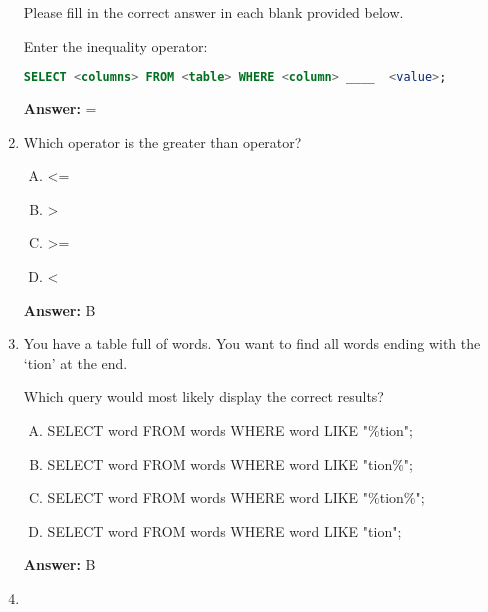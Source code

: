 \documentclass[12pt]{article}
\begin{document}
\begin{enumerate}[1.]
    Please fill in the correct answer in each blank provided below.

    \bigskip

    Enter the inequality operator:

    \bigskip

    \begin{lstlisting}[language=SQL]
    SELECT <columns> FROM <table> WHERE <column> ____  <value>;
    \end{lstlisting}

    \bigskip

    \textbf{Answer:} =

    \item

    Which operator is the greater than operator?

    \bigskip

    \begin{enumerate}[A.]
        \item <=
        \item >
        \item >=
        \item <
    \end{enumerate}

    \bigskip

    \textbf{Answer:} B

    \item

    You have a table full of words. You want to find all words ending with the
    `tion' at the end.

    \bigskip

    Which query would most likely display the correct results?

    \bigskip

    \begin{enumerate}[A.]
        \item SELECT word FROM words WHERE word LIKE "\%tion";
        \item SELECT word FROM words WHERE word LIKE "tion\%";
        \item SELECT word FROM words WHERE word LIKE "\%tion\%";
        \item SELECT word FROM words WHERE word LIKE "tion";
    \end{enumerate}

    \bigskip

    \textbf{Answer:} B

    \item


\end{enumerate}
\end{document}
